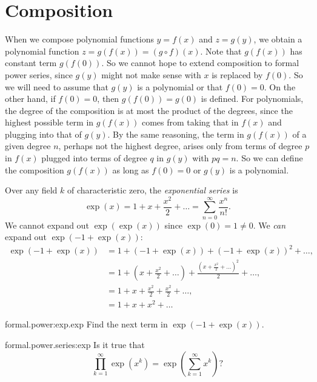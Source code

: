 \section{Composition}
When we compose polynomial functions \(y=f(x)\) and \(z=g(y)\), we obtain a polynomial function \(z=g(f(x))=(g\circ f)(x)\).
Note that \(g(f(x))\) has constant term \(g(f(0))\).
So we cannot hope to extend composition to formal power series, since \(g(y)\) might not make sense with \(x\) is replaced by \(f(0)\).
So we will need to assume that \(g(y)\) is a polynomial or that \(f(0)=0\).
On the other hand, if \(f(0)=0\), then \(g(f(0))=g(0)\) is defined.
For polynomials, the degree of the composition is at most the product of the degrees, since the highest possible term in \(g(f(x))\) comes from taking that in \(f(x)\) and plugging into that of \(g(y)\).
By the same reasoning, the term in \(g(f(x))\) of a given degree \(n\), perhaps not the highest degree, arises only from terms of degree \(p\) in \(f(x)\) plugged into terms of degree \(q\) in \(g(y)\) with \(pq=n\). 
So we can define the composition \(g(f(x))\) as long as \(f(0)=0\) or \(g(y)\) is a polynomial.
\begin{example}
Over any field \(k\) of characteristic zero, the \emph{exponential series} is
\[
\exp(x)=1+x+\frac{x^2}{2}+\dots=\sum_{n=0}^{\infty} \frac{x^n}{n!}.
\]
We cannot expand out \(\exp(\exp(x))\) since \(\exp(0)=1\ne 0\).
We \emph{can} expand out \(\exp(-1+\exp(x))\):
\begin{align*}
\exp(-1+\exp(x))
&=
1+(-1+\exp(x))+(-1+\exp(x))^2+\dots,
\\
&=
1+\left(x+\frac{x^2}{2}+\dots\right)+\frac{\left(x+\frac{x^2}{2}+\dots\right)^2}{2}+\dots,
\\
&=
1+x+\frac{x^2}{2}+\frac{x^2}{2}+\dots,
\\
&=1+x+x^2+\dots
\end{align*}
\end{example}
\begin{problem}{formal.power:exp.exp}
Find the next term in \(\exp(-1+\exp(x))\).
\end{problem}
\begin{problem}{formal.power.series:exp}
Is it true that
\[
\prod_{k=1}^{\infty}\exp(x^k)
=
\exp\left(\sum_{k=1}^{\infty} x^k\right)?
\]
\end{problem}

